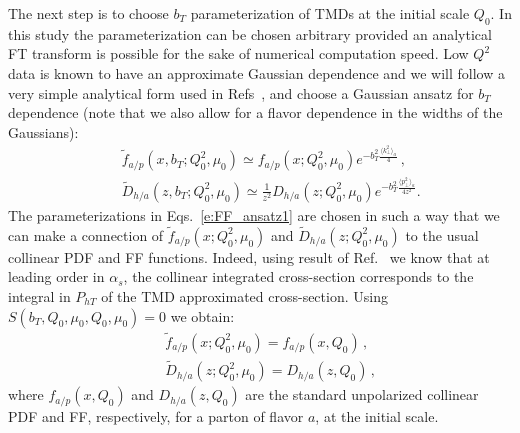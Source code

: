 \documentclass[final,3p,times,onecolumn,sort&compress,hidelinks]{elsarticle}
\newcommand\3[1]{\boldsymbol{#1}}
\begin{document}
The next step is to choose $b_T$ parameterization of TMDs at the initial scale $Q_0$. In this study the parameterization can be chosen arbitrary provided an analytical FT transform is possible for the sake of numerical computation speed. Low $Q^2$ data is known \cite{Schweitzer:2010tt} to have an approximate Gaussian dependence and we will follow a very simple analytical form used in Refs~\cite{Anselmino:2013lza,Signori:2013mda}, and choose a Gaussian ansatz for $b_T$ dependence (note that we also allow for a flavor dependence in the widths of the Gaussians):
\begin{eqnarray}
&&\tilde f_{a/p} (x,b_T; Q_0^2, \mu_0)\simeq f_{a/p} (x; Q_0^2, \mu_0) e^{-b_T^2 \frac{\langle k_\perp^2 \rangle_a}{4}}\,,
\nonumber \\[0.3cm]
&&\tilde D_{h/a}(z,b_T; Q_0^2, \mu_0)\simeq \frac{1}{z^2} D_{h/a}(z; Q_0^2, \mu_0) e^{-b_T^2 \frac{\langle p_\perp^2 \rangle_a}{4 z^2}}.
\label{e:FF_ansatz1}
\end{eqnarray}
The parameterizations in Eqs.~\eqref{e:FF_ansatz1} are chosen in such a way that we can make a connection of $\tilde f_{a/p} (x; Q_0^2, \mu_0)$ and $\tilde D_{h/a}(z; Q_0^2, \mu_0)$ to the usual collinear PDF and FF functions. Indeed, using result of Ref.~\cite{Collins:2016hqq} we know that at leading order in $\alpha_s$, the collinear integrated cross-section corresponds to the integral in $P_{hT}$ of the TMD approximated cross-section. Using $S(b_T, Q_0, \mu_0, Q_0, \mu_0) = 0$ we obtain:
\begin{eqnarray}
&&\tilde f_{a/p} (x; Q_0^2, \mu_0) = f_{a/p} (x, Q_0)\,,
\\[0.3cm]
&&\tilde D_{h/a}(z; Q_0^2, \mu_0) = D_{h/a}(z, Q_0)\,,
\label{e:FF_ansatz2}
\end{eqnarray}
where $f_{a/p} (x, Q_0)$ and $D_{h/a}(z, Q_0)$ are the standard unpolarized collinear PDF and FF, respectively, for a parton of flavor $a$, at the initial scale.
\end{document}
